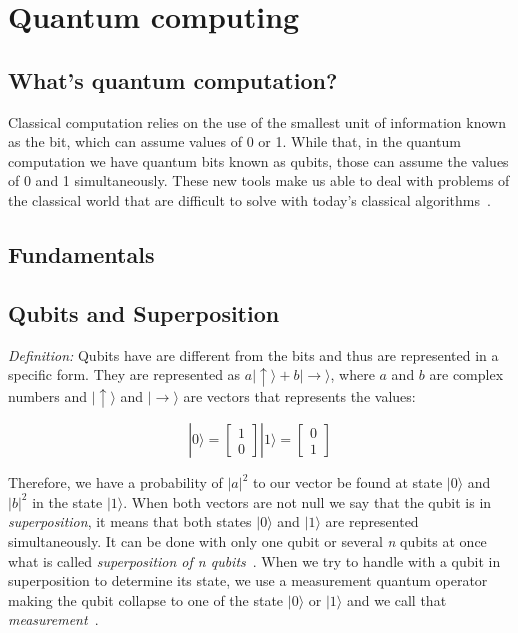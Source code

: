 \documentclass[conference]{IEEEtran}
\begin{document}
\section{Quantum computing}\label{sec:qc}
\subsection{What's quantum computation?}\label{subsec:what's-quantum-computation?}

Classical computation relies on the use of the smallest unit of information known as the bit, which can assume values of
0 or 1.
While that, in the quantum computation we have quantum bits known as qubits, those can
assume the values of 0 and 1 simultaneously.
These new tools make us able to deal with problems of the classical world that are difficult
to solve with today's classical algorithms~\cite{russon_2017,deutsch1992rapid}.

\subsection{Fundamentals}\label{subsec:fundamentals}

\subsection{Qubits and Superposition}\label{subsec:qubits-and-superposition}

\textit{Definition:} Qubits have are different from the bits and thus are represented in a specific form.
They are represented as \(a|\uparrow\rangle + b|\rightarrow\rangle\), where \(a\) and \(b\) are complex
numbers and \(|\uparrow\rangle\) and \(|\rightarrow\rangle\) are vectors that represents the values:

\[ |0\rangle = \begin{bmatrix} 1 \\ 0\end{bmatrix}  |1\rangle = \begin{bmatrix} 0 \\ 1\end{bmatrix}\]

Therefore, we have a probability of \(|a|^2\) to our vector be found at state \(|0\rangle \) and
\(|b|^2\) in the state \(|1\rangle\).
When both vectors are not null we say that the qubit is in \textit{superposition}, it means that both states
\(|0\rangle\) and \(|1\rangle\) are represented simultaneously.
It can be done with only one qubit or several \textit{n} qubits at once what is called
\textit{superposition of n qubits}~\cite{yanofsky2008quantum,rieffel2014quantum}.
When we try to handle with a qubit in superposition to determine its state, we use a measurement quantum operator
making the qubit collapse to one of the state \(|0\rangle\) or \(|1\rangle\) and we call that
\textit{measurement}~\cite{yanofsky2008quantum,rieffel2014quantum}.
\end{document}
